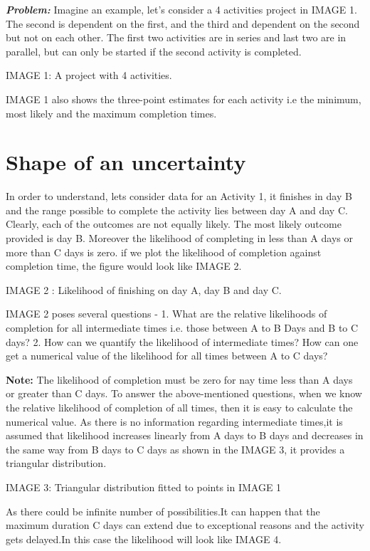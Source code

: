 \emph{\textbf{Problem:}} Imagine an example, let’s consider a 4 activities project in IMAGE 1. The second is dependent on the first, and the third and dependent on the second but not on each other. The first two activities are in series and last two are in parallel, but can only be started if the second activity is completed.

IMAGE 1: A project with 4 activities.

IMAGE 1 also shows the three-point estimates for each activity i.e the minimum, most likely and the maximum completion times.

\section{Shape of an uncertainty}
	
In order to understand, lets consider data for an Activity 1, it finishes in day B and the range possible to complete
the activity lies between day A and day C. Clearly, each of the outcomes are not equally likely. The most likely outcome provided is day B. Moreover the likelihood of completing in less than A days or more than C days is zero. if we plot the likelihood of completion against completion time, the figure would look like IMAGE 2.

IMAGE 2 : Likelihood of finishing on day A, day B and day C.

IMAGE 2 poses several questions - 
1. What are the relative likelihoods of completion for all intermediate times i.e. those between A to B Days and B to C days?
2. How can we quantify the likelihood of intermediate times? How can one get a numerical value of the likelihood for all times between A to C days?  

\textbf{Note:} The likelihood of completion must be zero for nay time less than A days or greater than C days.
To answer the above-mentioned questions, when we know the relative likelihood of completion of all times, then it is easy to calculate the numerical value. As there is no information regarding intermediate times,it is assumed that likelihood increases linearly from A days to B days and decreases in the same way from B days to C days as shown in the IMAGE 3, it provides a triangular distribution.

IMAGE 3: Triangular distribution fitted to points in IMAGE 1

As there could be infinite number of possibilities.It can happen that the maximum duration C days can extend due to exceptional reasons and the activity gets delayed.In this case the likelihood will look like IMAGE 4.

